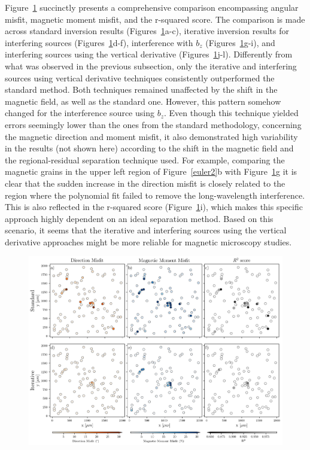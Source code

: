 Figure~\ref{inversion2} succinctly presents a comprehensive comparison encompassing angular misfit, magnetic moment misfit, and the r-squared score. The comparison is made across standard inversion results (Figures~\ref{inversion2}a-c), iterative inversion results for interfering sources (Figures~\ref{inversion2}d-f), interference with $b_z$ (Figures~\ref{inversion2}g-i), and interfering sources using the vertical derivative (Figures~\ref{inversion2}j-l). Differently from what was observed in the previous subsection, only the iterative and interfering sources using vertical derivative techniques consistently outperformed the standard method. Both techniques remained unaffected by the shift in the magnetic field, as well as the standard one. However, this pattern somehow changed for the interference source using $b_z$. Even though this technique yielded errors seemingly lower than the ones from the standard methodology, concerning the magnetic direction and moment misfit, it also demonstrated high variability in the results (not shown here) according to the shift in the magnetic field and the regional-residual separation technique used. For example, comparing the magnetic grains in the upper left region of Figure~\ref{euler2}b with Figure~\ref{inversion2}g it is clear that the sudden increase in the direction misfit is closely related to the region where the polynomial fit failed to remove the long-wavelength interference. This is also reflected in the r-squared score (Figure~\ref{inversion2}i), which makes this specific approach highly dependent on an ideal separation method. Based on this scenario, it seems that the iterative and interfering sources using the vertical derivative approaches might be more reliable for magnetic microscopy studies.

\begin{figure}[tb!]
  \centering
  \includegraphics[width=1\linewidth]{figures/inversion-comparion-2.png}
  \caption{
      }
  \label{inversion2}
\end{figure}

